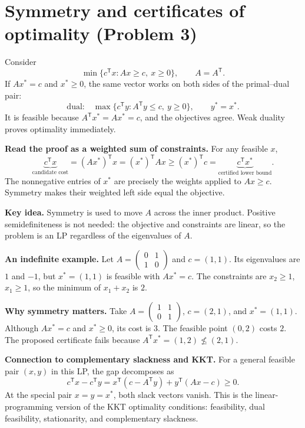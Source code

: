 \documentclass[11pt]{article}
\newenvironment{keyidea}{\begin{shaded}\noindent\textbf{Key idea.} }{\end{shaded}}
\newcommand{\T}{^{\mathsf T}}
\begin{document}
\newpage
\section{Symmetry and certificates of optimality (Problem 3)}
Consider
\[
\min\{c\T x:Ax\ge c,\ x\ge0\},\qquad A=A\T.
\]
If $Ax^*=c$ and $x^*\ge0$, the same vector works on both sides of the
primal--dual pair:
\[
\text{dual:}\quad\max\{c\T y:A\T y\le c,\ y\ge0\},\qquad y^*=x^*.
\]
It is feasible because $A\T x^*=Ax^*=c$, and the objectives agree.
Weak duality proves optimality immediately.

\textbf{Read the proof as a weighted sum of constraints.} For any feasible $x$,
\[
\underbrace{c\T x}_{\text{candidate cost}}
=(Ax^*)\T x
=(x^*)\T Ax
\ge(x^*)\T c
=\underbrace{c\T x^*}_{\text{certified lower bound}}.
\]
The nonnegative entries of $x^*$ are precisely the weights applied to
$Ax\ge c$. Symmetry makes their weighted left side equal the objective.

\begin{keyidea}
Symmetry is used to move $A$ across the inner product. Positive
semidefiniteness is not needed: the objective and constraints are linear,
so the problem is an LP regardless of the eigenvalues of $A$.
\end{keyidea}

\textbf{An indefinite example.}
Let $A=\left(\begin{smallmatrix}0&1\\1&0\end{smallmatrix}\right)$ and
$c=(1,1)$. Its eigenvalues are $1$ and $-1$, but $x^*=(1,1)$ is feasible
with $Ax^*=c$. The constraints are $x_2\ge1$, $x_1\ge1$, so the minimum
of $x_1+x_2$ is $2$.

\textbf{Why symmetry matters.}
Take $A=\left(\begin{smallmatrix}1&1\\0&1\end{smallmatrix}\right)$,
$c=(2,1)$, and $x^*=(1,1)$. Although $Ax^*=c$ and $x^*\ge0$,
its cost is $3$. The feasible point $(0,2)$ costs $2$.
The proposed certificate fails because $A\T x^*=(1,2)\nleq(2,1)$.

\textbf{Connection to complementary slackness and KKT.}
For a general feasible pair $(x,y)$ in this LP, the gap decomposes as
\[
c\T x-c\T y
=x\T(c-A\T y)+y\T(Ax-c)\ge0.
\]
At the special pair $x=y=x^*$, both slack vectors vanish. This is the
linear-programming version of the KKT optimality conditions: feasibility,
dual feasibility, stationarity, and complementary slackness.
\end{document}
